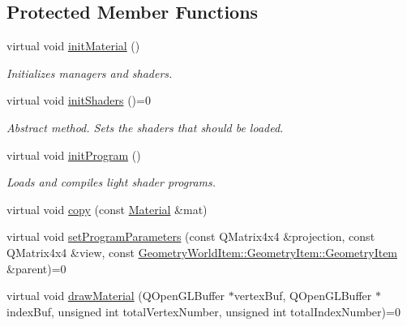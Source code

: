 \subsection*{Protected Member Functions}
\begin{DoxyCompactItemize}
\item 
\mbox{\label{class_geometry_engine_1_1_geometry_material_1_1_material_a31bb308f53741c015066ee112b497fcd}} 
virtual void \mbox{\hyperlink{class_geometry_engine_1_1_geometry_material_1_1_material_a31bb308f53741c015066ee112b497fcd}{init\+Material}} ()
\begin{DoxyCompactList}\small\item\em Initializes managers and shaders. \end{DoxyCompactList}\item 
\mbox{\label{class_geometry_engine_1_1_geometry_material_1_1_material_a06a1c603599a2c2b5488e6fdcbce00eb}} 
virtual void \mbox{\hyperlink{class_geometry_engine_1_1_geometry_material_1_1_material_a06a1c603599a2c2b5488e6fdcbce00eb}{init\+Shaders}} ()=0
\begin{DoxyCompactList}\small\item\em Abstract method. Sets the shaders that should be loaded. \end{DoxyCompactList}\item 
\mbox{\label{class_geometry_engine_1_1_geometry_material_1_1_material_a86cda85f55e61b5d66910e94ec4b1ff6}} 
virtual void \mbox{\hyperlink{class_geometry_engine_1_1_geometry_material_1_1_material_a86cda85f55e61b5d66910e94ec4b1ff6}{init\+Program}} ()
\begin{DoxyCompactList}\small\item\em Loads and compiles light shader programs. \end{DoxyCompactList}\item 
virtual void \mbox{\hyperlink{class_geometry_engine_1_1_geometry_material_1_1_material_a632cdbe72ea955bc591a3902f63b6061}{copy}} (const \mbox{\hyperlink{class_geometry_engine_1_1_geometry_material_1_1_material}{Material}} \&mat)
\item 
virtual void \mbox{\hyperlink{class_geometry_engine_1_1_geometry_material_1_1_material_a68310797df53062f237d0005fbcfce7e}{set\+Program\+Parameters}} (const Q\+Matrix4x4 \&projection, const Q\+Matrix4x4 \&view, const \mbox{\hyperlink{class_geometry_engine_1_1_geometry_world_item_1_1_geometry_item_1_1_geometry_item}{Geometry\+World\+Item\+::\+Geometry\+Item\+::\+Geometry\+Item}} \&parent)=0
\item 
virtual void \mbox{\hyperlink{class_geometry_engine_1_1_geometry_material_1_1_material_a0070eab6e5fe86dc05dc69f2e37b9072}{draw\+Material}} (Q\+Open\+G\+L\+Buffer $\ast$vertex\+Buf, Q\+Open\+G\+L\+Buffer $\ast$index\+Buf, unsigned int total\+Vertex\+Number, unsigned int total\+Index\+Number)=0
\end{DoxyCompactItemize}
